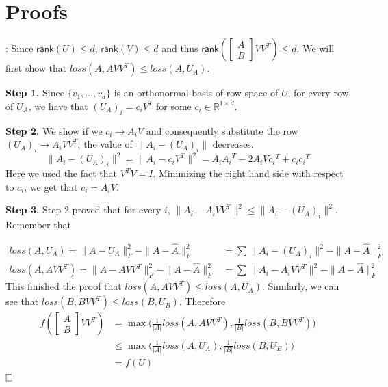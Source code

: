 \documentclass{article}
\newenvironment{proofof}[1]{\smallskip\noindent{\bf Proof of #1}:}{$\hfill \Box$\\}
\newcommand{\rank}{\mathsf{rank}}
\begin{document}
\section{Proofs}
\label{app:proof}

\begin{proofof}{Lemma~\ref{lem:A}}
Since $\rank(U) \leq d$, $\rank(V) \leq d$ and thus $\rank(\left[ \begin{array}{c} A \\ B \end{array} \right] VV^T) \leq d$. We will first show that $loss(A, AVV^T) \leq loss(A, U_A)$.

\textbf{Step 1.} Since $\{v_1,\ldots,v_d\}$ is an orthonormal basis of row space of $U$,  for every row of $U_A$, we have that $(U_A)_i = c_iV^T$ for some $c_i \in \mathbb{R}^{1 \times d}$.

\textbf{Step 2.} We show if we $c_i \rightarrow A_iV$ and consequently substitute the row $(U_A)_i \rightarrow A_i VV^T$, the value of $\|A_i - (U_A)_i\|$ decreases.
$$
\|A_i - (U_A)_i \|^2 = \|A_i - c_i V^T\|^2 = A_i {A_i}^T - 2A_i V {c_i}^T + c_i {c_i}^T
$$
Here we used the fact that $V^TV=I$. Minimizing the right hand side with respect to $c_i$, we get that $c_i = A_i V$.

\textbf{Step 3. }Step 2 proved that for every $i$, $\|A_i - A_i VV^T \|^2 \leq \|A_i - (U_A)_i \|^2$. Remember that

\begin{align*}
loss(A, U_A)  = \|A-U_A\|_F^2 - \|A-\widehat{A}\|_F^2 &= \sum \|A_i - (U_A)_i \|^2 - \|A-\widehat{A}\|_F^2    \\
loss(A, AVV^T)  = \|A-AVV^T\|_F^2 - \|A-\widehat{A}\|_F^2 &= \sum \|A_i - A_iVV^T \|^2 - \|A-\widehat{A}\|_F^2
\end{align*}
This finished the proof that $loss(A, AVV^T) \leq loss(A, U_A)$.  Similarly, we can see that $loss(B, BVV^T) \leq loss(B, U_B)$. Therefore
\begin{align*}
        f(\left[ \begin{array}{c} A \\ B \end{array} \right] VV^T) & = \max \big( \frac{1}{|A|} loss(A,AVV^T),  \frac{1}{|B|}  loss (B, BVV^T)\big)  \\
        & \leq \max \big( \frac{1}{|A|} loss(A,U_A),  \frac{1}{|B|}  loss (B, U_B)\big)\\
        &= f(U)
\end{align*}
\end{proofof}
\end{document}
